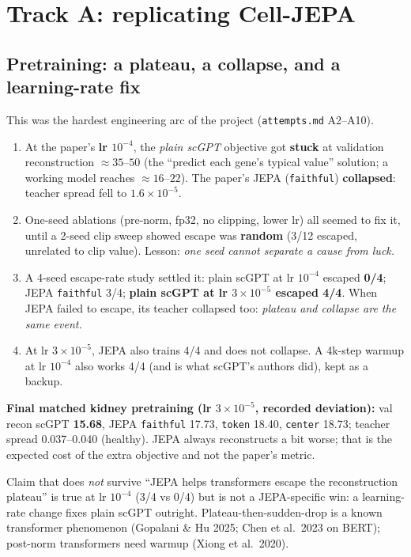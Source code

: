 \documentclass[11pt]{article}
\newcommand{\code}[1]{\texttt{\small #1}}
\begin{document}
\section{Track A: replicating Cell-JEPA}

\subsection{Pretraining: a plateau, a collapse, and a learning-rate fix}\label{sec:plateau}
This was the hardest engineering arc of the project (\code{attempts.md} A2--A10).
\begin{enumerate}
\item At the paper's \textbf{lr $10^{-4}$}, the \emph{plain scGPT} objective got \textbf{stuck} at validation reconstruction $\approx 35$--$50$ (the ``predict each gene's typical value'' solution; a working model reaches $\approx 16$--$22$). The paper's JEPA (\code{faithful}) \textbf{collapsed}: teacher spread fell to $1.6\times10^{-5}$.
\item One-seed ablations (pre-norm, fp32, no clipping, lower lr) all seemed to fix it, until a 2-seed clip sweep showed escape was \textbf{random} (3/12 escaped, unrelated to clip value). Lesson: \emph{one seed cannot separate a cause from luck.}
\item A 4-seed escape-rate study settled it: plain scGPT at lr $10^{-4}$ escaped \textbf{0/4}; JEPA \code{faithful} 3/4; \textbf{plain scGPT at lr $3\times10^{-5}$ escaped 4/4}. When JEPA failed to escape, its teacher collapsed too: \emph{plateau and collapse are the same event.}
\item At lr $3\times10^{-5}$, JEPA also trains 4/4 and does not collapse. A 4k-step warmup at lr $10^{-4}$ also works 4/4 (and is what scGPT's authors did), kept as a backup.
\end{enumerate}
\textbf{Final matched kidney pretraining (lr $3\times10^{-5}$, recorded deviation):} val recon scGPT \textbf{15.68}, JEPA \code{faithful} 17.73, \code{token} 18.40, \code{center} 18.73; teacher spread 0.037--0.040 (healthy). JEPA always reconstructs a bit worse; that is the expected cost of the extra objective and not the paper's metric.

\begin{warnbox}{Claim that does \emph{not} survive}
``JEPA helps transformers escape the reconstruction plateau'' is true at lr $10^{-4}$ (3/4 vs 0/4) but is not a JEPA-specific win: a learning-rate change fixes plain scGPT outright. Plateau-then-sudden-drop is a known transformer phenomenon (Gopalani \& Hu 2025; Chen et al.\ 2023 on BERT); post-norm transformers need warmup (Xiong et al.\ 2020).
\end{warnbox}
\end{document}
